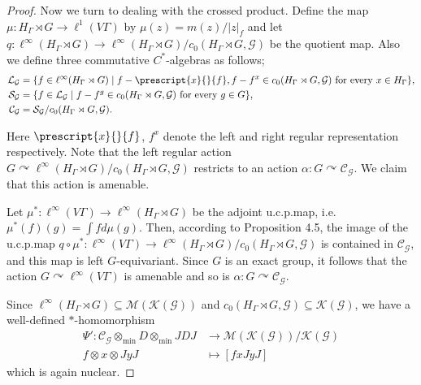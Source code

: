 \documentclass{amsart}
\theoremstyle{definition}
\renewcommand{\subset}{\subseteq}
\newcommand{\Cstaralgs}{$C^{\ast}$-algebras\xspace}
\newcommand{\mintensor}{\otimes_{\mathrm{min}}}
\begin{document}
\begin{proof}
Now we turn to dealing with the crossed product. Define the map
$\mu : H_{\Gamma}\rtimes G\to \ell^1(V\Gamma)$ by $\mu(z)=m(z)/|z|_f$ and let $q: \ell^{\infty}(H_{\Gamma}\rtimes G)\to \ell^{\infty}(H_{\Gamma}\rtimes G)/c_0(H_{\Gamma}\rtimes G, \mathcal{G})$ be the quotient map. Also we define 
three commutative \Cstaralgs as follows; 
\begin{align}
\mathcal{L}_{\mathcal{G}}
&= \{ f\in \ell^{\infty} (H_{\Gamma}\rtimes G)
\mid f- \prescript{x}{}{f}, f-f^x\in c_0(H_{\Gamma}\rtimes G, \mathcal{G}) \text{ for every } x\in H_{\Gamma}\}, \\
\mathcal{S}_{\mathcal{G}} 
&= \{ f\in \mathcal{L}_{\mathcal{G}}
\mid f-f^g \in c_0(H_{\Gamma}\rtimes G, \mathcal{G}) \text{ for every } g\in G\}, \\
\mathcal{C}_{\mathcal{G}}&= \mathcal{S}_{\mathcal{G}}/c_0(H_{\Gamma}\rtimes G, \mathcal{G}). 
\end{align}

Here $\prescript{x}{}{f}$, $f^x$ denote the left and right regular representation respectively. 
Note that the left regular action $G\curvearrowright \ell^{\infty}(H_{\Gamma}\rtimes G)/c_0(H_{\Gamma}\rtimes G, \mathcal{G})$ restricts to an action $\alpha: G\curvearrowright \mathcal{C}_{\mathcal{G}}$. We claim that this action is amenable. 

Let $\mu^{\ast} : \ell^{\infty}(V\Gamma) \to \ell^{\infty}(H_{\Gamma}\rtimes G)$ be the adjoint u.c.p.\@ map, i.e. $\mu^{\ast}(f)(g)= \int f d\mu(g)$. 
Then, according to Proposition 4.5, the image of the u.c.p.\@ map 
$q\circ \mu^{\ast} : \ell^{\infty}(V\Gamma) \to \ell^{\infty}(H_{\Gamma}\rtimes G)/c_0(H_{\Gamma}\rtimes G, \mathcal{G})$ is contained in $\mathcal{C}_{\mathcal{G}}$, and this map is left $G$-equivariant. Since $G$ is an exact group, it follows that the action $G\curvearrowright \ell^{\infty}(V\Gamma)$ is amenable and so is $\alpha : G\curvearrowright \mathcal{C}_{\mathcal{G}}$. 


Since $\ell^{\infty}(H_{\Gamma}\rtimes G)\subset \mathcal{M}(\mathcal{K}(\mathcal{G}))$ and $c_0(H_{\Gamma}\rtimes G, \mathcal{G})\subset \mathcal{K}(\mathcal{G})$, we have a well-defined $\ast$-homomorphism
\begin{align}
\Psi' : \mathcal{C}_{\mathcal{G}}\mintensor D\mintensor JDJ &\longrightarrow \mathcal{M}(\mathcal{K}(\mathcal{G}))/\mathcal{K}(\mathcal{G}) \\
f\otimes x\otimes JyJ &\longmapsto [fxJyJ]
\end{align}
which is again nuclear. 


\end{proof}
\end{document}
